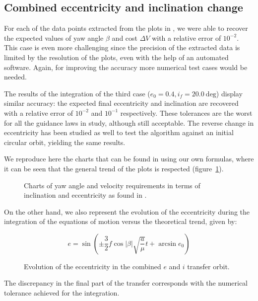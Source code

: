 \subsection{Combined eccentricity and inclination change}

For each of the data points extracted from the plots in \cite{pollard2000simplified}, we were able to recover the expected values of yaw angle $\beta$ and cost $\Delta V$ with a relative error of $10^{-2}$. This case is even more challenging since the precision of the extracted data is limited by the resolution of the plots, even with the help of an automated software. Again, for improving the accuracy more numerical test cases would be needed.

The results of the integration of the third case ($e_0 = 0.4, i_f = 20.0~\text{deg}$) display similar accuracy: the expected final eccentricity and inclination are recovered with a relative error of $10^{-2}$ and $10^{-1}$ respectively. These tolerances are the worst for all the guidance laws in study, although still acceptable. The reverse change in eccentricity has been studied as well to test the algorithm against an initial circular orbit, yielding the same results.

We reproduce here the charts that can be found in \cite{pollard2000simplified} using our own formulas, where it can be seen that the general trend of the plots is respected (figure~\ref{fig:eccincnumcharts}). 

\begin{figure}%
\begin{subfigure}[b]{0.5\textwidth}
\centering
\resizebox{1.0\textwidth}{!}{

}
\end{subfigure}
\begin{subfigure}[b]{0.5\textwidth}
\centering
\resizebox{1.0\textwidth}{!}{

}
\end{subfigure}
\caption{Charts of yaw angle and velocity requirements in terms of inclination and eccentricity as found in  \cite{pollard2000simplified}.}
\label{fig:eccincnumcharts}
\end{figure}

On the other hand, we also represent the evolution of the eccentricity during the integration of the equations of motion versus the theoretical trend, given by:

\[
e = \sin{\left( \pm \frac{3}{2} f \cos{|\beta|} \sqrt{\frac{a}{\mu}} t + \arcsin{e_0} \right)}
\]

\begin{figure}[b]
\centering
\resizebox{0.8\textwidth}{!}{

}
\caption{Evolution of the eccentricity in the combined $e$ and $i$ transfer orbit.}
\label{fig:eccincecc}
\end{figure}

The discrepancy in the final part of the transfer corresponds with the numerical tolerance achieved for the integration.
